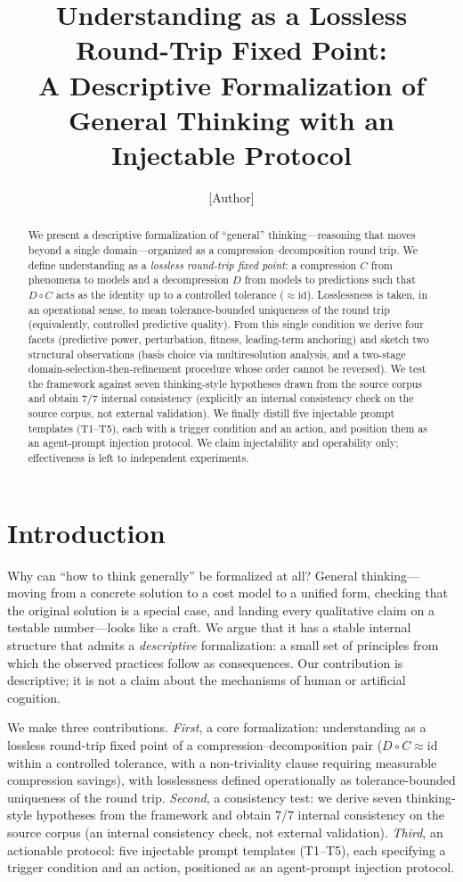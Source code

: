 \documentclass[11pt]{article}
\title{Understanding as a Lossless Round-Trip Fixed Point:\\
A Descriptive Formalization of General Thinking with an Injectable Protocol}
\author{[Author]}
\date{}
\newcommand{\Cmap}{C}
\newcommand{\Dmap}{D}
\begin{document}
\maketitle

\begin{abstract}
We present a descriptive formalization of ``general'' thinking---reasoning that
moves beyond a single domain---organized as a compression--decomposition round
trip. We define understanding as a \emph{lossless round-trip fixed point}: a
compression $\Cmap$ from phenomena to models and a decompression $\Dmap$ from
models to predictions such that $\Dmap\circ\Cmap$ acts as the identity up to a
controlled tolerance ($\approx\mathrm{id}$). Losslessness is taken, in an
operational sense, to mean tolerance-bounded uniqueness of the round trip
(equivalently, controlled predictive quality). From this single condition we
derive four facets (predictive power, perturbation, fitness, leading-term
anchoring) and sketch two structural observations (basis choice via
multiresolution analysis, and a two-stage
domain-selection-then-refinement procedure whose order cannot be
reversed). We test the framework against seven thinking-style hypotheses drawn
from the source corpus and obtain 7/7 internal consistency (explicitly an
internal consistency check on the source corpus, not external validation). We
finally distill five injectable prompt templates (T1--T5), each with a trigger
condition and an action, and position them as an agent-prompt injection protocol.
We claim injectability and operability only; effectiveness is left to independent
experiments.
\end{abstract}
\section{Introduction}
\label{sec:intro}

Why can ``how to think generally'' be formalized at all? General thinking---
moving from a concrete solution to a cost model to a unified form, checking that
the original solution is a special case, and landing every qualitative claim on
a testable number---looks like a craft. We argue that it has a stable internal
structure that admits a \emph{descriptive} formalization: a small set of
principles from which the observed practices follow as consequences. Our
contribution is descriptive; it is not a claim about the mechanisms of human or
artificial cognition.

We make three contributions. \emph{First}, a core formalization: understanding
as a lossless round-trip fixed point of a compression--decomposition pair
($\Dmap\circ\Cmap\approx\mathrm{id}$ within a controlled tolerance, with a
non-triviality clause requiring measurable compression savings), with
losslessness defined operationally as tolerance-bounded uniqueness of the round
trip. \emph{Second}, a consistency test: we derive seven
thinking-style hypotheses from the framework and obtain 7/7 internal consistency
on the source corpus (an internal consistency check, not external validation).
\emph{Third}, an actionable protocol: five injectable prompt templates
(T1--T5), each specifying a trigger condition and an action, positioned as an
agent-prompt injection protocol.
\end{document}
